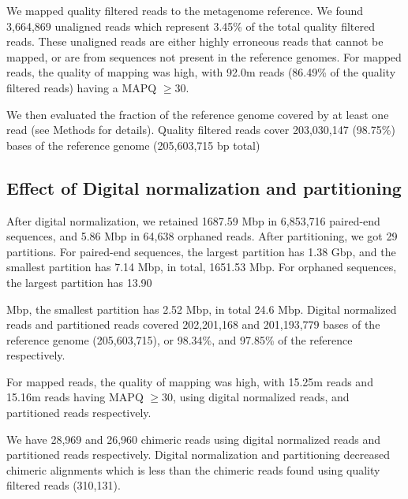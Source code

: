 We mapped quality filtered reads to the metagenome reference. 
We found 3,664,869 unaligned reads which represent 3.45\% of the
total quality filtered reads.  These unaligned reads are either highly
erroneous reads that cannot be mapped, or are from sequences not
present in the reference genomes.  For mapped reads, the quality of
mapping was high, with 92.0m reads (86.49\% of the quality filtered reads) having a MAPQ $\geq 30$.

We then evaluated the fraction of the reference genome covered by at
least one read (see Methods for details). Quality filtered
reads cover 203,030,147 (98.75\%) bases of the reference genome
(205,603,715 bp total)


\subsection *{Effect of Digital normalization and partitioning} 

After digital normalization, we retained 
1687.59 Mbp in 6,853,716 paired-end sequences, and 5.86 Mbp in 64,638 orphaned reads. 
 After partitioning, we
got 29 partitions.  For paired-end sequences,  the largest partition has  %
1.38 Gbp, and the smallest partition has 7.14 Mbp, in total, 1651.53
Mbp.  For orphaned sequences, the largest partition has 13.90

Mbp, the smallest partition has 2.52 Mbp, in total  24.6 Mbp.  
Digital normalized reads and partitioned reads covered 
202,201,168 and 201,193,779  bases of the reference genome (205,603,715), or 98.34\%, and 97.85\% of the reference respectively.

For mapped reads, the quality of mapping was high, with 15.25m reads  and 15.16m reads having MAPQ $\geq 30$, using digital
normalized reads, and partitioned reads respectively.

We have 28,969 and 26,960 chimeric
reads using digital normalized reads and partitioned reads
respectively. Digital normalization and partitioning decreased
chimeric alignments which is less than the chimeric reads found using quality filtered reads (310,131). %

